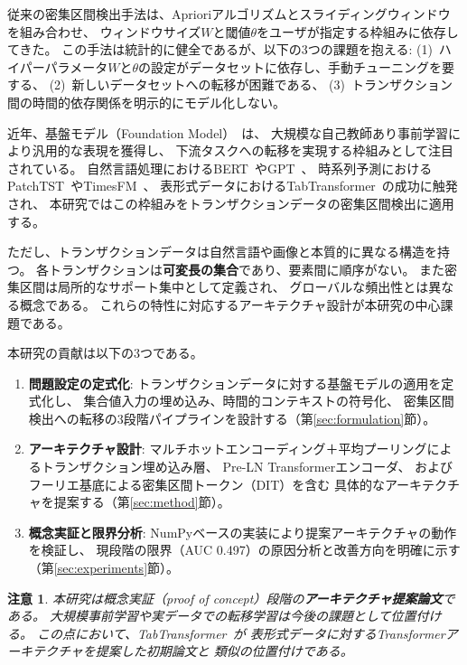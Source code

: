 \documentclass[sigconf,nonacm]{acmart}
\newtheorem{remark}{注意}
\begin{document}
従来の密集区間検出手法は、Aprioriアルゴリズムとスライディングウィンドウを組み合わせ、
ウィンドウサイズ$W$と閾値$\theta$をユーザが指定する枠組みに依存してきた。
この手法は統計的に健全であるが、以下の3つの課題を抱える:
(1)~ハイパーパラメータ$W$と$\theta$の設定がデータセットに依存し、手動チューニングを要する、
(2)~新しいデータセットへの転移が困難である、
(3)~トランザクション間の時間的依存関係を明示的にモデル化しない。

近年、基盤モデル（Foundation Model）~\cite{bommasani2021opportunities}は、
大規模な自己教師あり事前学習により汎用的な表現を獲得し、
下流タスクへの転移を実現する枠組みとして注目されている。
自然言語処理におけるBERT~\cite{devlin2019bert}やGPT~\cite{brown2020language}、
時系列予測におけるPatchTST~\cite{nie2023patchtst}やTimesFM~\cite{das2024timesfm}、
表形式データにおけるTabTransformer~\cite{huang2020tabtransformer}の成功に触発され、
本研究ではこの枠組みをトランザクションデータの密集区間検出に適用する。

ただし、トランザクションデータは自然言語や画像と本質的に異なる構造を持つ。
各トランザクションは\textbf{可変長の集合}であり、要素間に順序がない。
また密集区間は局所的なサポート集中として定義され、
グローバルな頻出性とは異なる概念である。
これらの特性に対応するアーキテクチャ設計が本研究の中心課題である。

本研究の貢献は以下の3つである。

\begin{enumerate}
    \item \textbf{問題設定の定式化}:
    トランザクションデータに対する基盤モデルの適用を定式化し、
    集合値入力の埋め込み、時間的コンテキストの符号化、
    密集区間検出への転移の3段階パイプラインを設計する（第\ref{sec:formulation}節）。

    \item \textbf{アーキテクチャ設計}:
    マルチホットエンコーディング＋平均プーリングによるトランザクション埋め込み層、
    Pre-LN Transformerエンコーダ、
    およびフーリエ基底による密集区間トークン（DIT）を含む
    具体的なアーキテクチャを提案する（第\ref{sec:method}節）。

    \item \textbf{概念実証と限界分析}:
    NumPyベースの実装により提案アーキテクチャの動作を検証し、
    現段階の限界（AUC 0.497）の原因分析と改善方向を明確に示す（第\ref{sec:experiments}節）。
\end{enumerate}

\begin{remark}
本研究は概念実証（proof of concept）段階の\textbf{アーキテクチャ提案論文}である。
大規模事前学習や実データでの転移学習は今後の課題として位置付ける。
この点において、TabTransformer~\cite{huang2020tabtransformer}が
表形式データに対するTransformerアーキテクチャを提案した初期論文と
類似の位置付けである。
\end{remark}
\end{document}
